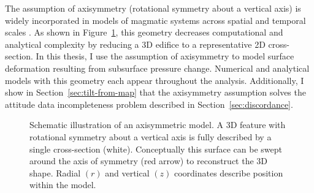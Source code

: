 The assumption of axisymmetry (rotational symmetry about a vertical axis) is widely incorporated in models of magmatic systems across spatial and temporal scales \parencite[c.f.,][]{redmond_numerical_2004,ogawa_four-stage_2021,mogi_relations_1958,mctigue_elastic_1987}. As shown in Figure~\ref{fig:axisymmetry}, this geometry decreases computational and analytical complexity by reducing a 3D edifice to a representative 2D cross-section. In this thesis, I use the assumption of axisymmetry to model surface deformation resulting from subsurface pressure change. Numerical and analytical models with this geometry each appear throughout the analysis. Additionally, I show in Section~\ref{sec:tilt-from-map} that the axisymmetry assumption solves the attitude data incompleteness problem described in Section~\ref{sec:discordance}.

\begin{figure}
    \caption[Axisymmetry]{Schematic illustration of an axisymmetric model. A 3D feature with rotational symmetry about a vertical axis is fully described by a single cross-section (white). Conceptually this surface can be swept around the axis of symmetry (red arrow) to reconstruct the 3D shape. Radial $(r)$ and vertical $(z)$ coordinates describe position within the model.}%
    \label{fig:axisymmetry}
\end{figure}